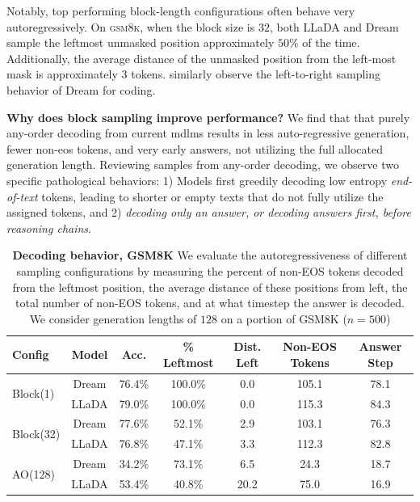 Notably, top performing block-length configurations often behave very autoregressively. On \textsc{gsm8k}, when the block size is $32$, both LLaDA and Dream sample the leftmost unmasked position approximately $50\%$ of the time. Additionally, the average distance of the unmasked position from the left-most mask is approximately $3$ tokens. \cite{gong2025diffucoder} similarly observe the left-to-right sampling behavior of Dream for coding.

\textbf{Why does block sampling improve performance?} We find that that purely any-order decoding from current \glspl{mdlm} results in less auto-regressive generation, fewer non-eos tokens, and very early answers, not utilizing the full allocated generation length. Reviewing samples from any-order  decoding, we observe two specific pathological behaviors: 1) Models first greedily decoding low entropy \textit{end-of-text} tokens, leading to shorter or empty texts that do not fully utilize the assigned tokens, and 2) \textit{decoding only an answer, or decoding answers first, {before} reasoning chains}. 

\begin{table}[h]
    \centering
    \begin{tabular}{l c ccccc}
        \toprule
        \textbf{Config} & \textbf{Model} & \textbf{Acc.} & \textbf{\% Leftmost} & \textbf{Dist. Left} & \textbf{Non-EOS Tokens} & \textbf{Answer Step} \\
        \midrule
        \multirow{2}{*}{Block(1)}     
            & Dream  & 76.4\% & 100.0\% & 0.0 & 105.1 & 78.1 \\
            & LLaDA  & 79.0\% & 100.0\% & 0.0 & 115.3 & 84.3 \\
            \midrule
        \multirow{2}{*}{Block(32)}  
            & Dream  & 77.6\% & 52.1\%  & 2.9 & 103.1 & 76.3 \\
            & LLaDA  & 76.8\% & 47.1\%  & 3.3 & 112.3 & 82.8 \\
                        \midrule

        \multirow{2}{*}{AO(128)} 
            & Dream  & 34.2\% & 73.1\%  & 6.5 & 24.3  & 18.7 \\
            & LLaDA  & 53.4\% & 40.8\%  & 20.2 & 75.0  & 16.9 \\
        \bottomrule
    \end{tabular}
        \caption{\textbf{Decoding behavior, GSM8K} We evaluate the autoregressiveness of different sampling configurations by measuring the percent of non-EOS tokens decoded from the leftmost position, the average distance of these positions from left, the total number of non-EOS tokens, and at what timestep the answer is decoded. We consider generation lengths of $128$ on a portion of GSM8K ($n=500$)}
        \label{tab:gsm8k_behavior}
\end{table}


